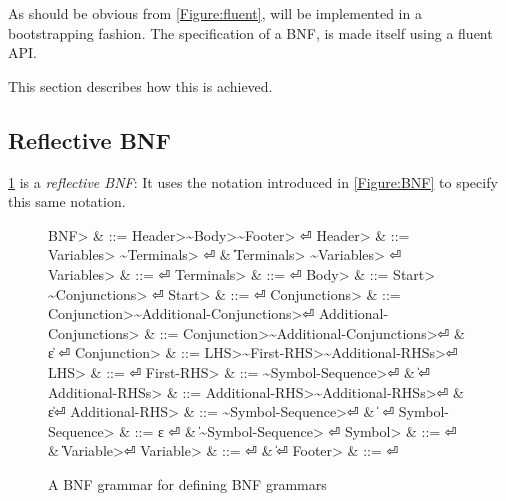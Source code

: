 As should be obvious from \cref{Figure:fluent}, \Self will be implemented
  in a bootstrapping fashion.
The specification of a BNF, is made itself using a fluent API.

This section describes how this is achieved.

\subsection{Reflective BNF}
\cref{Figure:BNF:BNF} is a \emph{reflective BNF}:
It uses the notation introduced in \cref{Figure:BNF}
  to specify this same notation.

\begin{figure}[H]
  \begin{Grammar}
    \begin{aligned}
      \<BNF>                     & ::= \<Header>\~\<Body>\~\<Footer> \hfill⏎
      \<Header>                  & ::= \<Variables> \~\<Terminals> \hfill⏎
      {}                         & \| \<Terminals> \~\<Variables> \hfill⏎
      \<Variables>               & ::= \hfill⏎
      \<Terminals>               & ::= \hfill⏎
      \<Body>                    & ::= \<Start> \~\<Conjunctions> \hfill⏎
      \<Start>                   & ::=  \hfill⏎
      \<Conjunctions>            & ::= \<Conjunction>\~\<Additional-Conjunctions>\hfill⏎
      \<Additional-Conjunctions> & ::= \<Conjunction>\~\<Additional-Conjunctions>\hfill⏎
      {}                         & \| ε \hfill⏎
      \<Conjunction>             & ::= \<LHS>\~\<First-RHS>\~\<Additional-RHSs>\hfill⏎
      \<LHS>                     & ::= \hfill⏎
      \<First-RHS>               & ::= \~\<Symbol-Sequence>\hfill⏎
      {}                         & \| \hfill⏎
      \<Additional-RHSs>         & ::= \<Additional-RHS>\~\<Additional-RHSs>\hfill⏎
      {}                         & \| ε\hfill⏎
      \<Additional-RHS>          & ::= \~\<Symbol-Sequence>\hfill⏎
      {}                         & \|  \hfill⏎
      \<Symbol-Sequence>         & ::= ε \hfill⏎
      {}                         & \| \~\<Symbol-Sequence> \hfill⏎
      \<Symbol>                  & ::=  \hfill⏎
      {}                         & \| \<Variable>\hfill⏎
      \<Variable>                & ::=  \hfill⏎
      {}                         & \| \hfill⏎
      \<Footer>                  & ::= \hfill⏎
    \end{aligned}
  \end{Grammar}
  \caption{A BNF grammar for defining BNF grammars}
  \label{Figure:BNF:BNF}
\end{figure}
\begin{comment}
Note that this specification can only be approximate;
the figure uses verbs as replacement to indentation,
and special symbols such as~$|$,~$::-$ and~$ε$.
\end{comment}

